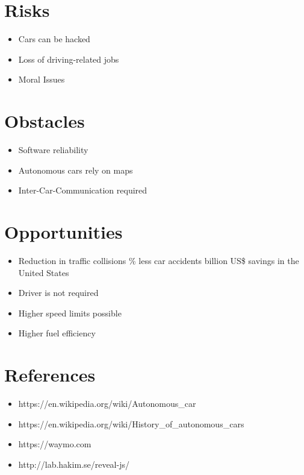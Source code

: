 \documentclass[a4paper,11pt]{article}
\begin{document}
\section{Risks}
\begin{itemize}
 \item Cars can be hacked
 \item Loss of driving-related jobs
 \item Moral Issues
\end{itemize}

\section{Obstacles}
\begin{itemize}
 \item Software reliability
 \item Autonomous cars rely on maps
 \item Inter-Car-Communication required
\end{itemize}

\section{Opportunities}
\begin{itemize}
 \item Reduction in traffic collisions
    \% less car accidents
     billion US\$ savings in the United States
 \item Driver is not required
 \item Higher speed limits possible
 \item Higher fuel efficiency
\end{itemize}

\section{References}
\begin{itemize}
 \item{https://en.wikipedia.org/wiki/Autonomous\_car}
 \item{https://en.wikipedia.org/wiki/History\_of\_autonomous\_cars}
 \item{https://waymo.com}
 \item{http://lab.hakim.se/reveal-js/}
\end{itemize}
\end{document}
